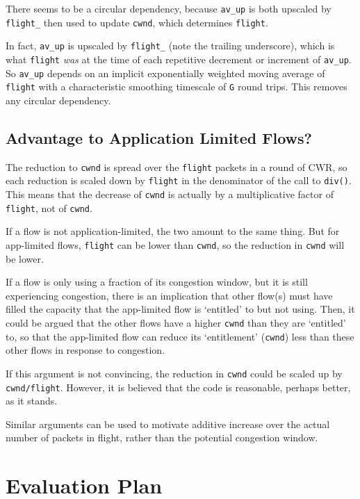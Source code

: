 There seems to be a circular dependency, because \texttt{av\_up} is both
upscaled by \texttt{flight\_} then used to update \texttt{cwnd}, which
determines \texttt{flight}.

In fact, \texttt{av\_up} is upscaled by \texttt{flight\_} (note the trailing
underscore), which is what \texttt{flight} \emph{was} at the time of each
repetitive decrement or increment of \texttt{av\_up}. So \texttt{av\_up} depends
on an implicit exponentially weighted moving average of \texttt{flight} with a
characteristic smoothing timescale of \texttt{G} round trips. This removes any
circular dependency.

\subsection{Advantage to Application Limited
	Flows?}\label{prresp_Advantage_App-Limited}

The reduction to \texttt{cwnd} is spread over the \texttt{flight} packets in a
round of CWR, so each reduction is scaled down by \texttt{flight} in the
denominator of the call to \texttt{div()}. This means that the
decrease of \texttt{cwnd} is actually by a multiplicative factor of
\texttt{flight}, not of \texttt{cwnd}.

If a flow is not application-limited, the two amount to the same thing. But for
app-limited flows, \texttt{flight} can be lower than \texttt{cwnd}, so the
reduction in \texttt{cwnd} will be lower.

If a flow is only using a fraction of its congestion window, but it is still
experiencing congestion, there is an implication that other flow(s) must have
filled the capacity that the app-limited flow is `entitled' to but not using.
Then, it could be argued that the other flows have a higher \texttt{cwnd} than
they are `entitled' to, so that the app-limited flow can reduce its
`entitlement' (\texttt{cwnd}) less than these other flows in response to
congestion.

If this argument is not convincing, the reduction in \texttt{cwnd} could be
scaled up by \texttt{cwnd/flight}. However, it is believed that the code is
reasonable, perhaps better, as it stands.

Similar arguments can be used to motivate additive increase over the actual
number of packets in flight, rather than the potential congestion window.

\section{Evaluation Plan}\label{prresp_Evaluation}

